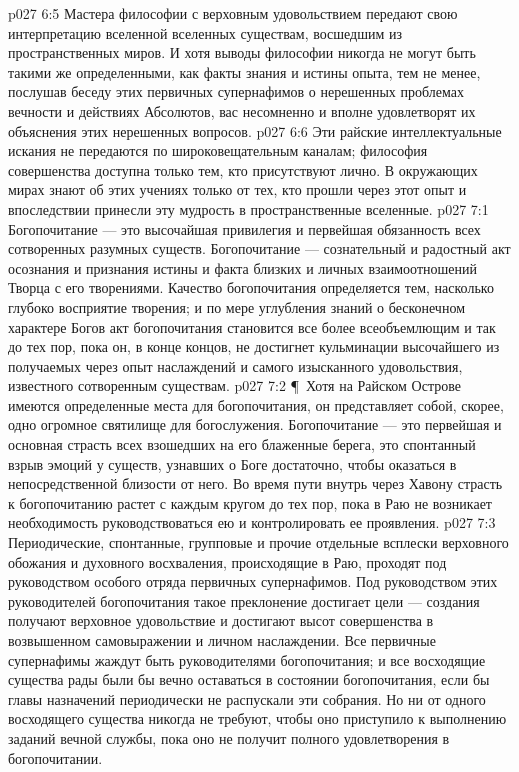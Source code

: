 \vs p027 6:5 Мастера философии с верховным удовольствием передают свою интерпретацию вселенной вселенных существам, восшедшим из пространственных миров. И хотя выводы философии никогда не могут быть такими же определенными, как факты знания и истины опыта, тем не менее, послушав беседу этих первичных супернафимов о нерешенных проблемах вечности и действиях Абсолютов, вас несомненно и вполне удовлетворят их объяснения этих нерешенных вопросов.
\vs p027 6:6 Эти райские интеллектуальные искания не передаются по широковещательным каналам; философия совершенства доступна только тем, кто присутствуют лично. В окружающих мирах знают об этих учениях только от тех, кто прошли через этот опыт и впоследствии принесли эту мудрость в пространственные вселенные.
\vs p027 7:1 Богопочитание --- это высочайшая привилегия и первейшая обязанность всех сотворенных разумных существ. Богопочитание --- сознательный и радостный акт осознания и признания истины и факта близких и личных взаимоотношений Творца с его творениями. Качество богопочитания определяется тем, насколько глубоко восприятие творения; и по мере углубления знаний о бесконечном характере Богов акт богопочитания становится все более всеобъемлющим и так до тех пор, пока он, в конце концов, не достигнет кульминации высочайшего из получаемых через опыт наслаждений и самого изысканного удовольствия, известного сотворенным существам.
\vs p027 7:2 \P\ Хотя на Райском Острове имеются определенные места для богопочитания, он представляет собой, скорее, одно огромное святилище для богослужения. Богопочитание --- это первейшая и основная страсть всех взошедших на его блаженные берега, это спонтанный взрыв эмоций у существ, узнавших о Боге достаточно, чтобы оказаться в непосредственной близости от него. Во время пути внутрь через Хавону страсть к богопочитанию растет с каждым кругом до тех пор, пока в Раю не возникает необходимость руководствоваться ею и контролировать ее проявления.
\vs p027 7:3 Периодические, спонтанные, групповые и прочие отдельные всплески верховного обожания и духовного восхваления, происходящие в Раю, проходят под руководством особого отряда первичных супернафимов. Под руководством этих руководителей богопочитания такое преклонение достигает цели --- создания получают верховное удовольствие и достигают высот совершенства в возвышенном самовыражении и личном наслаждении. Все первичные супернафимы жаждут быть руководителями богопочитания; и все восходящие существа рады были бы вечно оставаться в состоянии богопочитания, если бы главы назначений периодически не распускали эти собрания. Но ни от одного восходящего существа никогда не требуют, чтобы оно приступило к выполнению заданий вечной службы, пока оно не получит полного удовлетворения в богопочитании.
